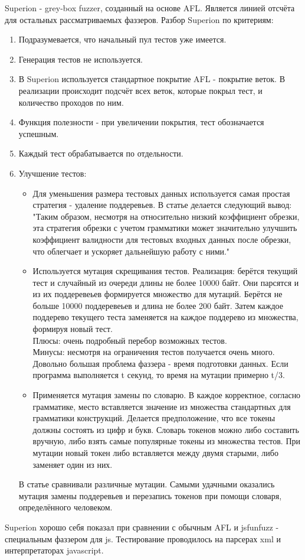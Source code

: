 \documentclass[a4paper]{article}
\begin{document}
Superion\cite{litlink3} - grey-box fuzzer, созданный на основе AFL. Является линией отсчёта для остальных рассматриваемых фаззеров. Разбор Superion по критериям: 
\begin{enumerate}
    \item Подразумевается, что начальный пул тестов уже имеется.
    \item Генерация тестов не используется.
    \item В Superion используется стандартное покрытие AFL - покрытие веток. В реализации происходит подсчёт всех веток, которые покрыл тест, и количество проходов по ним.
    \item Функция полезности - при увеличении покрытия, тест обозначается успешным.
    \item Каждый тест обрабатывается по отдельности.
    \item Улучшение тестов:
    \begin{itemize}
        \item Для уменьшения размера тестовых данных используется самая простая стратегия - удаление поддеревьев. В статье делается следующий вывод: "Таким образом, несмотря на относительно низкий коэффициент обрезки, эта стратегия обрезки с учетом грамматики может значительно улучшить коэффициент валидности для тестовых входных данных после обрезки, что облегчает и ускоряет дальнейшую работу с ними."
        \item Используется мутация скрещивания тестов. Реализация: берётся текущий тест и случайный из очереди длины не более 10000 байт. Они парсятся и из их поддеревеьев формируется множество для мутаций. Берётся не больше 10000 поддеревеьев и длина не более 200 байт.
        Затем каждое поддерево текущего теста заменяется на каждое поддерево из множества, формируя новый тест.\\
        Плюсы: очень подробный перебор возможных тестов.\\
        Минусы: несмотря на ограничения тестов получается очень много. Довольно большая проблема фаззера - время подготовки данных. Если программа выполняется t секунд, то время на мутации примерно t/3.
        \item Применяется мутация замены по словарю. В каждое корректное, согласно грамматике, место вставляется значение из множества стандартных для грамматики конструкций. Делается предположение, что все токены должны состоять из цифр и букв. Словарь токенов можно либо составить вручную, либо взять самые популярные токены из множества тестов. При мутации новый токен либо вставляется между двумя старыми, либо заменяет один из них.
    \end{itemize}
    В статье сравнивали различные мутации. Самыми удачными оказались мутация замены поддеревьев и перезапись токенов при помощи словаря, определённого человеком.
\end{enumerate}
Superion хорошо себя показал при сравнении с обычным AFL и jsfunfuzz - специальным фаззером для js. Тестирование проводилось на парсерах xml и интерпретаторах javascript.
\end{document}
